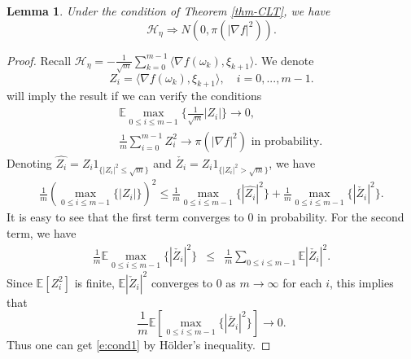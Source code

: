 \documentclass[12pt]{amsart}
\newtheorem{lemma}[theorem]{Lemma}
\theoremstyle{definition}
\theoremstyle{remark}
\numberwithin{equation}{section}
\newcommand{\E}{\mathbb{E}}            %
\newcommand{\Ll}{\langle}
\newcommand{\Rr}{\rangle}
\begin{document}
\begin{lemma}\label{l:clt}
	Under the condition of Theorem \ref{thm-CLT}, we have
	$$
	\mathcal{H}_\eta\Rightarrow N(0, \pi(|\nabla f|^2)).
	$$
\end{lemma}
\begin{proof}
	Recall $\mathcal{H}_\eta = -\frac{1}{\sqrt{m}}\sum_{k=0}^{m-1}\Ll\nabla f(\omega_k ),\xi_{k+1}\Rr$. We denote
	$$
	Z_i=\Ll\nabla f(\omega_k),\xi_{k+1}\Rr,\quad i=0,...,m-1.$$
	\cite[Theorem 2.3]{McL1974} will imply the result if we can verify the conditions
	\begin{eqnarray}
		&&\E\max_{0\le i\le m-1}\{\frac{1}{\sqrt m}|Z_i|\}\to0,\label{e:cond1}\\
		&&\frac{1}{m}\sum_{i=0}^{m-1}Z_i^2\to \pi(|\nabla f|^2)\text{~in probability.}\label{e:cond2}
	\end{eqnarray}
	Denoting $\hat{Z_i}=Z_i1_{\{|Z_i|^2\le \sqrt m\}}$ and
	$\check{Z_i}=Z_i1_{\{|Z_i|^2>\sqrt m\}}$, we have
	\begin{eqnarray*}
		\frac{1}{m}(\max_{0\le i\le m-1}\{|Z_i|\})^2\le \frac{1}{m}\max_{0\le i\le m-1}\{|\hat{Z_i}|^2\}+\frac{1}{m}\max_{0\le i\le m-1}\{|\check{Z_i}|^2\}.
	\end{eqnarray*}
	It is easy to see that the first term converges to $0$ in probability. For the second term, we have
	\begin{eqnarray*}
		\frac{1}{m}\E\max_{0\le i\le m-1}\{|\check{Z_i}|^2\}&\le &\frac{1}{m}\sum_{0\le i\le m-1} \E |\check{Z_i}|^2.
	\end{eqnarray*}
	Since $\E[Z_i^2]$ is finite, $ \E|\check Z_i|^2 $ converges to $0$ as $m\to\infty$ for each $i$, this implies that
	$$\frac{1}{m}\E[\max_{0\le i\le m-1}\{|\check{Z_i}|^2\}]\to 0.$$ Thus one can get \eqref{e:cond1}  by H\"{o}lder's inequality.
	

\end{proof}
\end{document}
